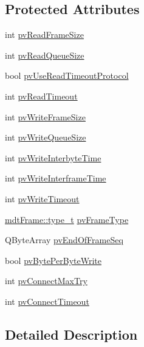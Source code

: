\subsection*{Protected Attributes}
\begin{DoxyCompactItemize}
\item 
int \hyperlink{classmdt_port_config_a89f0ded07219e4ddbec5f6f20a3798d5}{pv\-Read\-Frame\-Size}
\item 
int \hyperlink{classmdt_port_config_a999e392fa0d1e97428cef3d45a0f7983}{pv\-Read\-Queue\-Size}
\item 
bool \hyperlink{classmdt_port_config_a1a5ab2cf82ea35db627aa8b87f9dba2e}{pv\-Use\-Read\-Timeout\-Protocol}
\item 
int \hyperlink{classmdt_port_config_a69fa9f6cb32469f3eccfe7517dc29101}{pv\-Read\-Timeout}
\item 
int \hyperlink{classmdt_port_config_aeaeb93ea4d49f66ff9613c7499e670f4}{pv\-Write\-Frame\-Size}
\item 
int \hyperlink{classmdt_port_config_a547f27521b405528f86259fa9aaa37c5}{pv\-Write\-Queue\-Size}
\item 
int \hyperlink{classmdt_port_config_af983cf9d9f9e2f124d6dcc83cdca5a3e}{pv\-Write\-Interbyte\-Time}
\item 
int \hyperlink{classmdt_port_config_ace2001b084ab2611c2de56c951974457}{pv\-Write\-Interframe\-Time}
\item 
int \hyperlink{classmdt_port_config_ad840fd68971a9ccc6092ce2aa3167591}{pv\-Write\-Timeout}
\item 
\hyperlink{classmdt_frame_af936e37d5fe4c066c0fb0161fafd4a17}{mdt\-Frame\-::type\-\_\-t} \hyperlink{classmdt_port_config_a4bc3110b7831ca76954a8d8fc78944f1}{pv\-Frame\-Type}
\item 
Q\-Byte\-Array \hyperlink{classmdt_port_config_ad5d5aeb26cfe98090848a62f5078b22c}{pv\-End\-Of\-Frame\-Seq}
\item 
bool \hyperlink{classmdt_port_config_a56fb67591803bc972772073a6f2b996d}{pv\-Byte\-Per\-Byte\-Write}
\item 
int \hyperlink{classmdt_port_config_a46b87d1b9c2dbe30688497c34807d93c}{pv\-Connect\-Max\-Try}
\item 
int \hyperlink{classmdt_port_config_a3e6aa49486e716f834e174b5ce0a3909}{pv\-Connect\-Timeout}
\end{DoxyCompactItemize}


\subsection{Detailed Description}


